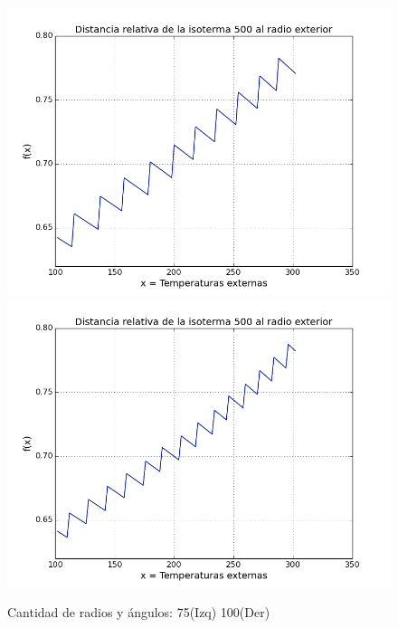 \begin{figure}[h]
\centering

\includegraphics[scale=0.3]{experimentos1a_1b/evolucion_estimacion_seguridad_isoterma/variacion_75.png}
\includegraphics[scale=0.3]{experimentos1a_1b/evolucion_estimacion_seguridad_isoterma/variacion_100.png}	

\caption{Cantidad de radios y ángulos: 75(Izq) 100(Der)}
\end{figure}

